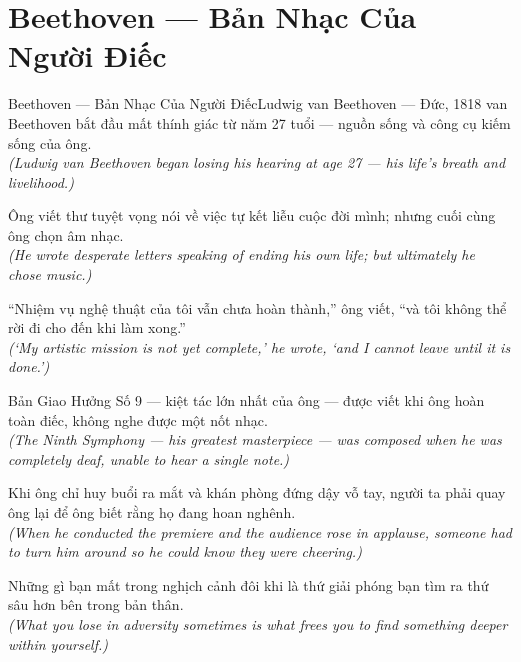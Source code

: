 \section{Beethoven --- Bản Nhạc Của Người Điếc}
\begin{truyen}{Beethoven --- Bản Nhạc Của Người Điếc}{Ludwig van Beethoven --- Đức, 1818}
 van Beethoven bắt đầu mất thính giác từ năm 27 tuổi --- nguồn sống và công cụ kiếm sống của ông.\\[4pt]
\textit{(Ludwig van Beethoven began losing his hearing at age 27 --- his life's breath and livelihood.)}

Ông viết thư tuyệt vọng nói về việc tự kết liễu cuộc đời mình; nhưng cuối cùng ông chọn âm nhạc.\\[4pt]
\textit{(He wrote desperate letters speaking of ending his own life; but ultimately he chose music.)}

``Nhiệm vụ nghệ thuật của tôi vẫn chưa hoàn thành,'' ông viết, ``và tôi không thể rời đi cho đến khi làm xong.''\\[4pt]
\textit{(`My artistic mission is not yet complete,' he wrote, `and I cannot leave until it is done.')}

Bản Giao Hưởng Số 9 --- kiệt tác lớn nhất của ông --- được viết khi ông hoàn toàn điếc, không nghe được một nốt nhạc.\\[4pt]
\textit{(The Ninth Symphony --- his greatest masterpiece --- was composed when he was completely deaf, unable to hear a single note.)}

Khi ông chỉ huy buổi ra mắt và khán phòng đứng dậy vỗ tay, người ta phải quay ông lại để ông biết rằng họ đang hoan nghênh.\\[4pt]
\textit{(When he conducted the premiere and the audience rose in applause, someone had to turn him around so he could know they were cheering.)}

\end{truyen}
\begin{baihoc}
  Những gì bạn mất trong nghịch cảnh đôi khi là thứ giải phóng bạn tìm ra thứ sâu hơn bên trong bản thân.\\[4pt]
  \textit{(What you lose in adversity sometimes is what frees you to find something deeper within yourself.)}
\end{baihoc}


